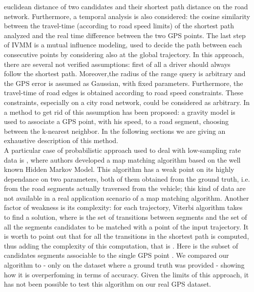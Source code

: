 \documentclass[5p]{elsarticle}
\begin{document}
euclidean distance of two candidates and their shortest path distance on the road network. Furthermore, a temporal analysis is also considered: the cosine similarity 
between the travel-time (according to road speed limits) of 
the shortest path analyzed and the real time difference between the two GPS points. The last step of IVMM is a mutual influence modeling, used to decide the path between 
each consecutive points by considering also at the global trajectory. 
In this approach, there are several not verified assumptions: first of all a driver should always follow the shortest path. Moreover,the radius of the range query is 
arbitrary and the GPS error is assumed as Gaussian,
with fixed parameters. Furthermore, the travel-time of road edges is obtained according to road speed constraints. These constraints, especially on a city road network, 
could be considered as arbitrary. In \cite{cintia2013gravity} a method to get rid of this assumption has been proposed: a gravity model is used to associate a GPS point, with his speed, to a road segment, 
choosing between the k-nearest neighbor. In the following sections we are giving an 
exhaustive description of this method. \\
A particular case of probabilistic approach used to deal with low-sampling rate data is \cite{newson2009hidden}, where authors developed a map matching algorithm based on 
the well known Hidden Markov Model. This algorithm has a weak point on its highly dependance on two parameters, both of them obtained from the ground truth, i.e. from the 
road segments actually traversed from the vehicle; this kind of data are not available in a real application scenario of a map matching algorithm. Another factor of weakness 
is its complexity: for each trajectory, Viterbi algorithm takes  to find a solution, where  is the set of transitions between segments and  the
set of all the segments candidates to be matched with a point of the input trajectory. It is worth to point out that for all the transitions in  the shortest path is
 computed, thus adding the complexity of this computation, that is . Here  is the subset of candidates 
segments associable to the single GPS point . We compared our algorithm to \cite{newson2009hidden} - only on the dataset where a ground truth was provided - showing how it is overperfoming in terms of accuracy. 
Given the limits of this approach, it has not been possible to test this algorithm on our real GPS dataset. 
\end{document}

